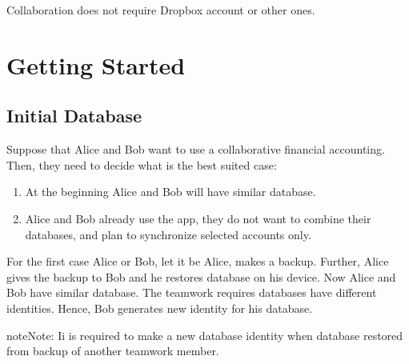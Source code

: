\documentclass[a4paper,10pt,english]{sphinxmanual}
\begin{document}
Collaboration does not require Dropbox account or other ones.


\section{Getting Started}
\label{\detokenize{teamwork:getting-started}}

\subsection{Initial Database}
\label{\detokenize{teamwork:initial-database}}
Suppose that Alice and Bob want to use a collaborative financial accounting.
Then, they need to decide what is the best suited case:
\begin{enumerate}
\def\theenumi{\arabic{enumi}}
\def\labelenumi{\theenumi .}
\makeatletter\def\p@enumii{\p@enumi \theenumi .}\makeatother
\item {} 
At the beginning Alice and Bob will have similar database.

\item {} 
Alice and Bob already use the app, they do not want to combine their databases, and plan to synchronize selected accounts only.

\end{enumerate}

For the first case Alice or Bob, let it be Alice, makes a backup. Further, Alice gives the
backup to Bob and he restores database on his device. Now Alice and Bob have similar database.
The teamwork requires databases have different identities. Hence, Bob generates new identity
for his database.

\begin{sphinxadmonition}{note}{Note:}
Ii is required to make a new database identity when database restored from backup of another teamwork member.
\end{sphinxadmonition}

\noindent{}

\noindent{}

\noindent{}

\noindent{}

\noindent{}
\end{document}
